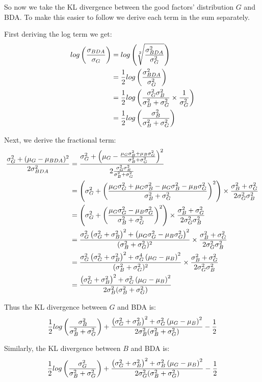 So now we take the KL divergence between the good factors' distribution $G$ and BDA. To make this easier to follow we derive each term in the sum separately.

First deriving the log term we get:
\begin{align}
	log\left(\frac{\sigma_{BDA}}{\sigma_{G}}\right)
	&= log\left(\sqrt[2]{\frac{\sigma_{BDA}^2}{\sigma_{G}^2}}\right)\\
	&= \frac{1}{2} log\left(\frac{\sigma_{BDA}^2}{\sigma_{G}^2}\right)\\
	&= \frac{1}{2} log\left(\frac{\sigma_G^2 \sigma_B^2}{\sigma_B^2 + \sigma_G^2} \times \frac{1}{\sigma_G^2}\right)\\
	&= \frac{1}{2} log\left(\frac{\sigma_B^2}{\sigma_B^2 + \sigma_G^2}\right)
\end{align}

Next, we derive the fractional term:
\begin{align}
	\frac{\sigma_{G}^2 + (\mu_{G} - \mu_{BDA})^2}{2\sigma_{BDA}^2}
	&= \frac{
			\sigma_G^2 + \left(\mu_G - \frac{\mu_G\sigma_B^2 + \mu_B\sigma_G^2}{\sigma_B^2 + \sigma_G^2}\right)^2
		}{
			2 \frac{\sigma_G^2 \sigma_B^2}{\sigma_B^2 + \sigma_G^2}
		}\\
	&= \left(\sigma_G^2 + \left(\frac{\mu_G\sigma_G^2 + \mu_G\sigma_B^2 - \mu_G\sigma_B^2 - \mu_B\sigma_G^2}{\sigma_B^2 + \sigma_G^2}\right)^2\right) \times \frac{\sigma_B^2 + \sigma_G^2}{2\sigma_G^2\sigma_B^2}\\
	&= \left(\sigma_G^2 + \left(\frac{\mu_G\sigma_G^2 - \mu_B\sigma_G^2}{\sigma_B^2 + \sigma_G^2}\right)^2\right) \times \frac{\sigma_B^2 + \sigma_G^2}{2\sigma_G^2\sigma_B^2}\\
	&= \frac{\sigma_G^2\left(\sigma_G^2 + \sigma_B^2\right)^2 + \left(\mu_G\sigma_G^2 - \mu_B\sigma_G^2\right)^2}{(\sigma_B^2 + \sigma_G^2)^2} \times \frac{\sigma_B^2 + \sigma_G^2}{2\sigma_G^2\sigma_B^2}\\
	&= \frac{\sigma_G^2\left(\sigma_G^2 + \sigma_B^2\right)^2 + \sigma_G^4\left(\mu_G - \mu_B\right)^2}{(\sigma_B^2 + \sigma_G^2)^2} \times \frac{\sigma_B^2 + \sigma_G^2}{2\sigma_G^2\sigma_B^2}\\
	&= \frac{\left(\sigma_G^2 + \sigma_B^2\right)^2 + \sigma_G^2\left(\mu_G - \mu_B\right)^2}{2\sigma_B^2(\sigma_B^2 + \sigma_G^2)}
\end{align}

Thus the KL divergence between $G$ and BDA is:
\begin{equation}
	\frac{1}{2} log\left(\frac{\sigma_B^2}{\sigma_B^2 + \sigma_G^2}\right) + \frac{\left(\sigma_G^2 + \sigma_B^2\right)^2 + \sigma_G^2\left(\mu_G - \mu_B\right)^2}{2\sigma_B^2(\sigma_B^2 + \sigma_G^2)} - \frac{1}{2}
\end{equation}

Similarly, the KL divergence between $B$ and BDA is:
\begin{equation}
	\frac{1}{2} log\left(\frac{\sigma_G^2}{\sigma_B^2 + \sigma_G^2}\right) + \frac{\left(\sigma_G^2 + \sigma_B^2\right)^2 + \sigma_B^2\left(\mu_G - \mu_B\right)^2}{2\sigma_G^2(\sigma_B^2 + \sigma_G^2)} - \frac{1}{2}
\end{equation}


